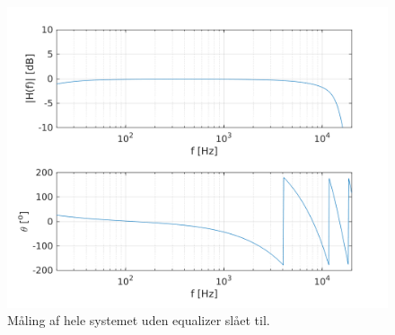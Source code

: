 	

%
%
%





%



\begin{figure}[h!]
\centering
\includegraphics[scale = 0.8]{matlabdemo/test/test_eq_off.png}  
\caption{Måling af hele systemet uden equalizer slået til.}
\label{fig:eq_off1}
\end{figure}

